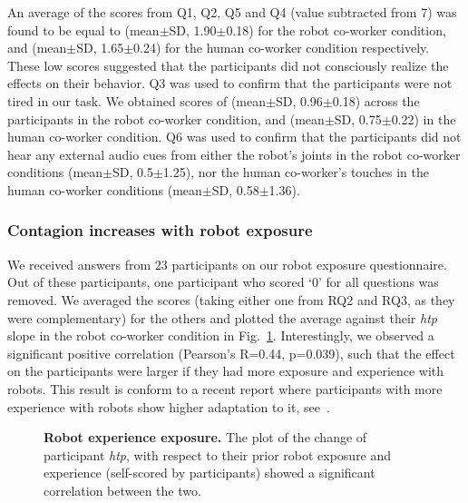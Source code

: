 An average of the scores from Q1, Q2, Q5 and Q4 (value subtracted from 7) was found to be equal to (mean$\pm$SD, 1.90$\pm$0.18) for the robot co-worker condition, and (mean$\pm$SD, 1.65$\pm$0.24) for the human co-worker condition respectively. These low scores suggested that the participants did not consciously realize the effects on their behavior. Q3 was used to confirm that the participants were not tired in our task. We obtained scores of (mean$\pm$SD, 0.96$\pm$0.18) across the participants in the robot co-worker condition, and (mean$\pm$SD, 0.75$\pm$0.22) in the human co-worker condition. Q6 was used to confirm that the participants did not hear any external audio cues from either the robot's joints in the robot co-worker conditions (mean$\pm$SD, 0.5$\pm$1.25), nor the human co-worker's touches in the human co-worker conditions (mean$\pm$SD, 0.58$\pm$1.36).

\subsubsection{Contagion increases with robot exposure}

We received answers from 23 participants on our robot exposure questionnaire. Out of these participants, one participant who scored `0' for all questions was removed. We averaged the scores (taking either one from RQ2 and RQ3, as they were complementary) for the others and plotted the average against their {\it htp} slope in the robot co-worker condition in Fig.~\ref{fig:corelation}. Interestingly, we observed a significant positive correlation (Pearson's R=0.44, p=0.039), such that the effect on the participants were larger if they had more exposure and experience with robots. This result is conform to a recent report where participants with more experience with robots show higher adaptation to it, see~\cite{vannucci:roman:2017}.


\begin{figure}[hpt]
	\caption{{\bf Robot experience exposure.} The plot of the change of participant {\it htp}, with respect to their prior robot exposure and experience (self-scored by participants) showed a significant correlation between the two.}
	\label{fig:corelation}
\end{figure}



